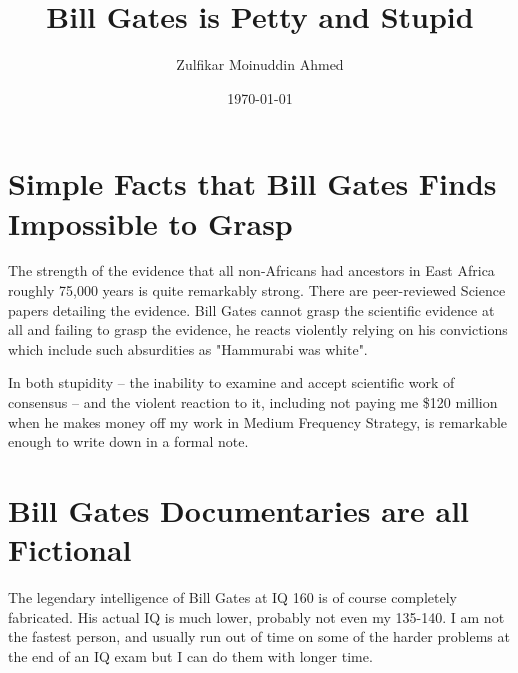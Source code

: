 \documentclass{amsart}
\title{Bill Gates is Petty and Stupid}
\author{Zulfikar Moinuddin Ahmed}
\date{\today}
\begin{document}
\maketitle

\section{Simple Facts that Bill Gates Finds Impossible to Grasp}

The strength of the evidence that all non-Africans had ancestors in East Africa roughly 75,000 years is quite remarkably strong.  There are peer-reviewed Science papers detailing the evidence.  Bill Gates cannot grasp the scientific evidence at all and failing to grasp the evidence, he reacts violently relying on his convictions which include such absurdities as "Hammurabi was white". 

In both stupidity -- the inability to examine and accept scientific work of consensus -- and the violent reaction to it, including not paying me \$120 million when he makes money off my work in Medium Frequency Strategy, is remarkable enough to write down in a formal note.

\section{Bill Gates Documentaries are all Fictional}
The legendary intelligence of Bill Gates at IQ 160 is of course completely fabricated.  His actual IQ is much lower, probably not even my 135-140.  I am not the fastest person, and usually run out of time on some of the harder problems at the end of an IQ exam but I can do them with longer time.
\end{document}
